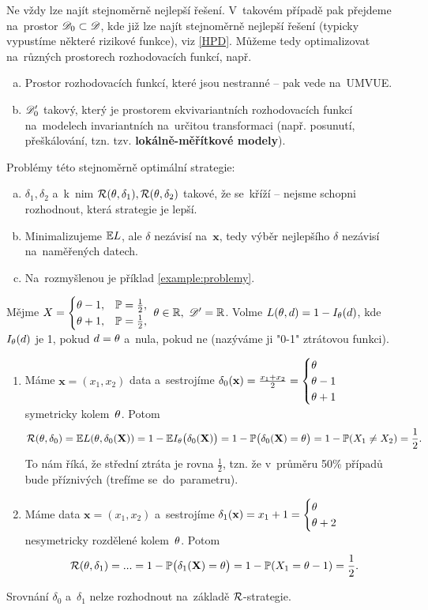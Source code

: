 Ne vždy lze najít stejnoměrně nejlepší řešení. V~takovém případě pak přejdeme na~prostor $\mathscr{D}_0\subset\mathscr{D} $, kde již lze najít stejnoměrně nejlepší řešení (typicky vypustíme některé rizikové funkce), viz \ref{HPD}. Můžeme tedy optimalizovat na~různých prostorech rozhodovacích funkcí, např.
\begin{enumerate}[a)]
	\item  Prostor rozhodovacích funkcí, které jsou nestranné -- pak vede na~UMVUE.
	\item $\mathscr{D}' _0$ takový, který je prostorem ekvivariantních rozhodovacích funkcí na~modelech invariantních na~určitou transformaci (např. posunutí, přeškálování, tzn. tzv. \textbf{lokálně-měřítkové modely}).
\end{enumerate}

Problémy této stejnoměrně optimální strategie: \begin{enumerate}[a)]
	\item $\delta_1,\delta_2$ a~k~nim $\mathcal{R}(\theta,\delta_1),\mathcal{R}(\theta,\delta_2)$ takové, že se~kříží -- nejsme schopni rozhodnout, která strategie je lepší.
	\item Minimalizujeme $\mathbb{E} L$, ale $\delta$ nezávisí na~$\textbf{x}$, tedy výběr nejlepšího $\delta$ nezávisí na~naměřených datech.
	\item Na~rozmyšlenou je příklad \ref{example:problemy}.
\end{enumerate}

\begin{example} \label{example:problemy}
	Mějme $X=\begin{cases}
	\theta-1, & \mathbb{P}= \frac{1}{2}, \\ \theta+1, & \mathbb{P}=\frac{1}{2},
	\end{cases}~\theta\in\mathbb{R},~\mathscr{D}' =\mathbb{R}$. Volme
	$ L(\theta,d)=1-I_\theta(d)$, kde $I_\theta(d)$ je 1, pokud $d=\theta$ a~nula, pokud ne (nazýváme ji "0-1" ztrátovou funkci).
	
	\begin{enumerate}[1)]
		\item Máme $\textbf{x}=(x_1,x_2)$ data a~sestrojíme $\delta_0(\textbf{x})=\frac{x_1+x_2}{2}=\begin{cases}
		\theta\\\theta-1\\\theta+1
		\end{cases}$ symetricky kolem~$\theta$. Potom
		$$ \mathcal{R}(\theta,\delta_0)=\mathbb{E} L(\theta,\delta_0(\textbf{X}))=1-\mathbb{E} I_\theta\big(\delta_0(\textbf{X})\big)=1-\mathbb{P}\big(\delta_0(\textbf{X})=\theta\big)=1-\mathbb{P}(X_1\neq X_2)=\frac{1}{2}.$$ To nám říká, že střední ztráta je rovna $\frac{1}{2}$, tzn. že v~průměru 50\% případů bude příznivých (trefíme se~do~parametru).
		\item Máme data $\textbf{x}=(x_1,x_2)$ a~sestrojíme $\delta_1(\textbf{x})=x_1+1=\begin{cases}
		\theta\\\theta+2
		\end{cases}$ nesymetricky rozdělené kolem~$\theta$. Potom
		$$\mathcal{R}(\theta,\delta_1)=...=1-\mathbb{P}\big(\delta_1(\textbf{X})=\theta\big)=1-\mathbb{P}(X_1=\theta-1)=\frac{1}{2}.$$
	\end{enumerate}
	Srovnání $\delta_0$ a~$\delta_1$ nelze rozhodnout na~základě $\mathcal{R}$-strategie. 
\end{example}
